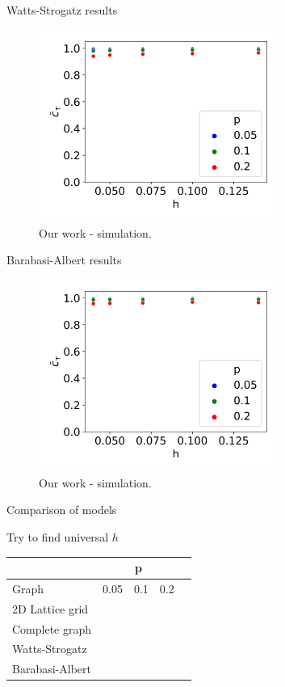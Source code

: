 \documentclass[10pt]{beamer}
\begin{document}
\begin{frame}{Watts-Strogatz results}
	\begin{figure}
		\includegraphics[width=0.7\textwidth]{../results/images/hp-watts-strogatz.png}
		\caption{Our work - simulation.}
	\end{figure}
\end{frame}

\begin{frame}{Barabasi-Albert results}
	\begin{figure}
		\includegraphics[width=0.7\textwidth]{../results/images/hp-barabasi-albert.png}
		\caption{Our work - simulation.}
	\end{figure}
\end{frame}

\begin{frame}{Comparison of models}
	
	Try to find universal $h$
	\begin{table}[]
		\begin{tabular}{l|llll}
			& \multicolumn{3}{c}{p} &  \\
			\hline
			Graph           & 0.05   & 0.1   & 0.2  &  \\
			\hline
			2D Lattice grid &        &       &      &  \\
			Complete graph  &        &       &      &  \\
			Watts-Strogatz  &        &       &      &  \\
			Barabasi-Albert &        &       &      & 
		\end{tabular}
	\end{table}
\end{frame}
\end{document}
